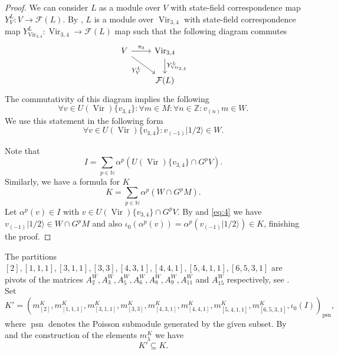 \documentclass[12pt, a4paper]{article}
\DeclareMathOperator{\Vir}{Vir}
\DeclareMathOperator{\psn}{psn}
\newcommand{\vachalf}{|1/2\rangle}
\begin{document}
\begin{proof}
  We can consider $L$ as a module over $V$ with state-field correspondence map $Y^L_{V}: V \to \mathcal{F}(L)$.
  By \cite[Theorem 4.2.]{wang_rationality_1993}, $L$ is a module over $\Vir_{3,4}$ with state-field correspondence map $Y^L_{\Vir_{3, 4}}: \Vir_{3, 4} \to \mathcal{F}(L)$ map such that the following diagram commutes
  \begin{equation*}
    \begin{tikzcd}
      V \arrow[r, "\pi_0"] \arrow[rd, "{Y^{L}_{V}}"'] & {\Vir_{3, 4}} \arrow[d, "{Y^{L}_{\Vir_{3, 4}}}"] \\
      & {\mathcal{F}(L)}
    \end{tikzcd}
  \end{equation*}
  The commutativity of this diagram implies the following
  \begin{equation*}
    \forall v\in U(\Vir)\{v_{3, 4}\}: \forall m \in M: \forall n \in \mathbb{Z}: v_{(n)}m \in W.
  \end{equation*}
  We use this statement in the following form
  \begin{equation}
    \label{eq:4}
    \forall v \in U(\Vir)\{v_{3, 4}\}: v_{(-1)}\vachalf \in W.
  \end{equation}
  
  Note that
  \begin{equation*}
    I = \sum_{p \in \mathbb{N}}\alpha^p(U(\Vir)\{v_{3, 4}\} \cap G^pV).
  \end{equation*}
  Similarly, we have a formula for $K$
  \begin{equation*}
    K = \sum_{p \in \mathbb{N}}\alpha^p(W \cap G^pM).
  \end{equation*}
  Let $\alpha^p(v) \in I$ with $v \in U(\Vir)\{v_{3, 4}\} \cap G^pV$.
  By  and \eqref{eq:4} we have $v_{(-1)}\vachalf \in W \cap G^pM$ and also $\iota_0(\alpha^p(v)) = \alpha^p(v_{(-1)}\vachalf) \in K$, finishing the proof.  
\end{proof}

The partitions $[2], [1, 1, 1], [3, 1, 1], [3, 3], [4, 3, 1], [4, 4, 1], [5, 4, 1, 1], [6, 5, 3, 1]$ are pivots of the matrices $A^W_2, A^W_3, A^W_5, A^W_6, A^W_8, A^W_9, A^W_{11}$ and $A^W_{15}$ respectively, see .
Set
\begin{equation*}
  K' = (m^K_{[2]}, m^K_{[1, 1, 1]}, m^K_{[3, 1, 1]}, m^K_{[3, 3]}, m^K_{[4, 3, 1]}, m^K_{[4, 4, 1]}, m^K_{[5, 4, 1, 1]}, m^K_{[6, 5, 3, 1]}, \iota_0(I))_{\psn},
\end{equation*}
where $\psn$ denotes the Poisson submodule generated by the given subset.
By  and the construction of the elements $m^K_\lambda$ we have
\begin{equation*}
K' \subseteq K.
\end{equation*}
\end{document}
